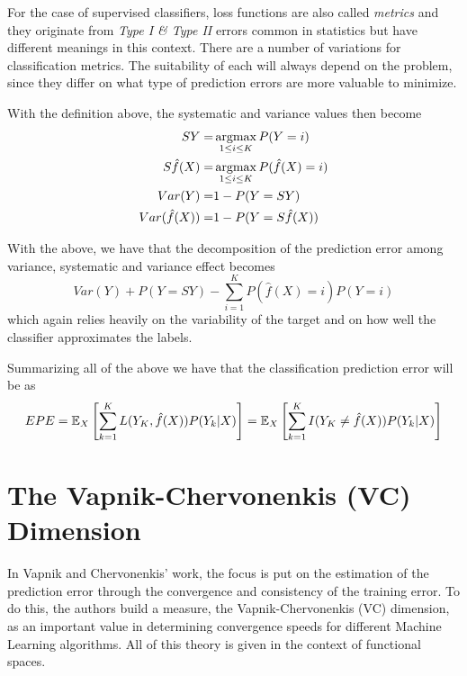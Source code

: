 For the case of supervised classifiers, loss functions are also called \textit{metrics} and they originate from \textit{Type I \& Type II} errors common in statistics but have different meanings in this context.
There are a number of variations for classification metrics.
The suitability of each will always depend on the problem, since they differ on what type of prediction errors are more valuable to minimize.

With the definition above, the systematic and variance values then become
\begin{equation}
    \begin{split}
    SY = & \operatorname*{argmax}_{1\leq i \leq K} P(Y=i) \\
    S\hat{f}(X) = &\operatorname*{argmax}_{1\leq i \leq K} P(\hat{f}(X)=i) \\
    Var(Y) = &1 - P(Y=SY) \\
    Var(\hat{f}(X)) =& 1 - P(Y = S\hat{f}(X)) \\
    \end{split}
\end{equation}


With the above, we have that the decomposition of the prediction error among variance, systematic and variance effect becomes
\begin{equation}
Var(Y) + P(Y=SY) - \sum_{i=1}^K P(\hat{f}(X) =i)P(Y=i)
\end{equation}
     which again relies heavily on the variability of the target and on how well the classifier approximates the labels.


Summarizing all of the above we have that the classification prediction error will be as
\begin{equation}
EPE = \operatorname{\mathbb{E}}_X\left[ \sum_{k=1}^{K} L( Y_K , \hat{f}(X) ) P(Y_k|X) \right] =
\operatorname{\mathbb{E}}_X\left[ \sum_{k=1}^{K} I(Y _K\neq \hat{f}(X)) P(Y_k|X) \right]
\end{equation}\label{eq:classificationEPE}


\section{The Vapnik-Chervonenkis (VC) Dimension }\label{appx:sec:vcDimension}

In Vapnik and Chervonenkis' work, the focus is put on the estimation of the prediction error through the convergence and consistency of the training error.
To do this, the authors build a measure, the Vapnik-Chervonenkis (VC) dimension, as an important value in determining convergence speeds for different Machine Learning algorithms.
All of this theory is given in the context of functional spaces.

